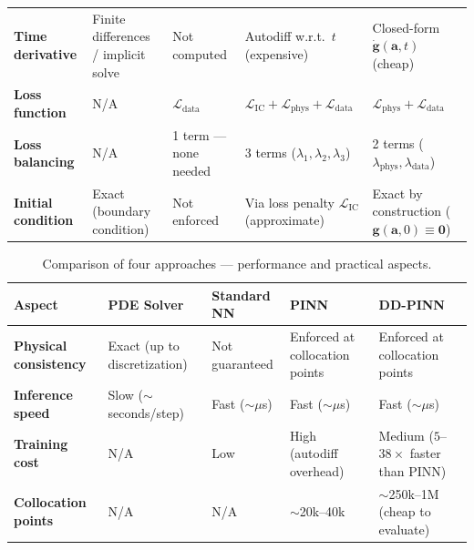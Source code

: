 \documentclass[11pt]{article}
\newcommand{\avec}{\bm{a}}
\begin{document}
\begin{landscape}
\begin{table}[H]
\begin{tabular}{@{} p{2.8cm} p{4.2cm} p{4.2cm} p{4.2cm} p{4.2cm} @{}}
\textbf{Time derivative}
    & Finite differences / implicit solve
    & Not computed
    & Autodiff w.r.t.\ $t$ (expensive)
    & Closed-form $\dot{\bm{g}}(\avec, t)$ (cheap) \\

\textbf{Loss function}
    & N/A
    & $\mathcal{L}_{\mathrm{data}}$
    & $\mathcal{L}_{\mathrm{IC}} + \mathcal{L}_{\mathrm{phys}} + \mathcal{L}_{\mathrm{data}}$
    & $\mathcal{L}_{\mathrm{phys}} + \mathcal{L}_{\mathrm{data}}$ \\

\textbf{Loss balancing}
    & N/A
    & 1 term --- none needed
    & 3 terms ($\lambda_1, \lambda_2, \lambda_3$)
    & 2 terms ($\lambda_{\mathrm{phys}}, \lambda_{\mathrm{data}}$) \\

\textbf{Initial condition}
    & Exact (boundary condition)
    & Not enforced
    & Via loss penalty $\mathcal{L}_{\mathrm{IC}}$ (approximate)
    & Exact by construction ($\bm{g}(\avec,0) \equiv \bm{0}$) \\

\bottomrule
\end{tabular}
\end{table}

\begin{table}[H]
\centering
\caption{Comparison of four approaches --- performance and practical aspects.}
\label{tab:four-way-b}
\footnotesize
\renewcommand{\arraystretch}{1.2}
\begin{tabular}{@{} p{2.8cm} p{4.2cm} p{4.2cm} p{4.2cm} p{4.2cm} @{}}
\toprule
\textbf{Aspect}
    & \textbf{PDE Solver}
    & \textbf{Standard NN}
    & \textbf{PINN}
    & \textbf{DD-PINN} \\
\midrule

\textbf{Physical consistency}
    & Exact (up to discretization)
    & Not guaranteed
    & Enforced at collocation points
    & Enforced at collocation points \\

\textbf{Inference speed}
    & Slow ($\sim$seconds/step)
    & Fast ($\sim\!\mu$s)
    & Fast ($\sim\!\mu$s)
    & Fast ($\sim\!\mu$s) \\

\textbf{Training cost}
    & N/A
    & Low
    & High (autodiff overhead)
    & Medium ($5$--$38\times$ faster than PINN) \\

\textbf{Collocation points}
    & N/A
    & N/A
    & $\sim$20k--40k
    & $\sim$250k--1M (cheap to evaluate) \\


\end{tabular}
\end{table}
\end{landscape}
\end{document}
